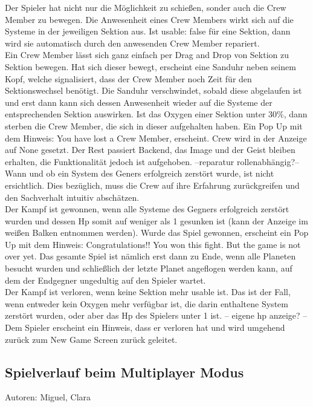 \documentclass[fontsize=12pt,paper=a4,twoside]{scrartcl}
\begin{document}
Der Spieler hat nicht nur die Möglichkeit zu schießen, sonder auch die Crew Member zu bewegen.
Die Anwesenheit eines Crew Members wirkt sich auf die Systeme in der jeweiligen Sektion aus.
Ist usable: false für eine Sektion, dann wird sie automatisch durch den anwesenden Crew Member repariert.\\
 Ein Crew Member lässt sich ganz einfach per Drag and Drop von Sektion zu Sektion bewegen.
Hat sich dieser bewegt, erscheint eine Sanduhr neben seinem Kopf, welche signalisiert, dass der Crew Member noch Zeit für den Sektionswechsel benötigt. Die Sanduhr verschwindet, sobald diese abgelaufen ist
 und erst dann kann sich dessen Anwesenheit wieder auf die Systeme der entsprechenden Sektion auswirken. Ist das Oxygen einer Sektion unter 30\%, dann sterben die Crew Member, die sich in dieser aufgehalten haben. Ein Pop Up mit dem Hinweis: You have lost a Crew Member, erscheint. Crew wird in der Anzeige auf None gesetzt.
Der Rest passiert Backend, das Image und der Geist bleiben erhalten, die Funktionalität jedoch ist aufgehoben. --reparatur rollenabhängig?--\\

Wann und ob ein System des Geners erfolgreich zerstört wurde, ist nicht ersichtlich.
Dies bezüglich, muss die Crew auf ihre Erfahrung zurückgreifen und den Sachverhalt intuitiv abschätzen.\\

Der Kampf ist gewonnen, wenn alle Systeme des Gegners erfolgreich zerstört wurden und dessen Hp somit auf weniger als 1 gesunken ist (kann der Anzeige im weißen Balken entnommen werden).
Wurde das Spiel gewonnen, erscheint ein Pop Up mit dem Hinweis: Congratulations!! You won this fight. But 
the game is not over yet. Das gesamte Spiel ist nämlich erst dann zu Ende, wenn alle Planeten besucht wurden und schließlich der letzte Planet angeflogen werden kann, auf dem der Endgegner ungedultig auf den Spieler wartet.\\

Der Kampf ist verloren, wenn keine Sektion mehr usable ist. Das ist der Fall, wenn entweder kein Oxygen mehr verfügbar ist, die darin enthaltene System zerstört wurden, oder aber das Hp des Spielers unter 1 ist.
-- eigene hp anzeige? --
Dem Spieler erscheint ein Hinweis, dass er verloren hat und wird umgehend zurück zum New Game Screen
zurück geleitet.\\


\subsection{Spielverlauf beim Multiplayer Modus}
Autoren: Miguel, Clara\\
\end{document}
